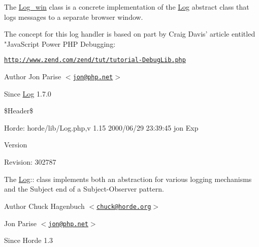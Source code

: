 The \hyperlink{class_log__win}{Log\_\-win} class is a concrete implementation of the \hyperlink{class_log}{Log} abstract class that logs messages to a separate browser window.

The concept for this log handler is based on part by Craig Davis' article entitled "JavaScript Power PHP Debugging:

\href{http://www.zend.com/zend/tut/tutorial-DebugLib.php}{\tt http://www.zend.com/zend/tut/tutorial-\/DebugLib.php}

\begin{DoxyAuthor}{Author}
Jon Parise $<$\href{mailto:jon@php.net}{\tt jon@php.net}$>$ 
\end{DoxyAuthor}
\begin{DoxySince}{Since}
\hyperlink{class_log}{Log} 1.7.0
\end{DoxySince}
\$Header\$ \begin{DoxyParagraph}{Horde:}
horde/lib/Log.php,v 1.15 2000/06/29 23:39:45 jon Exp 
\end{DoxyParagraph}


\begin{DoxyVersion}{Version}

\end{DoxyVersion}
\begin{DoxyParagraph}{Revision:}
302787 
\end{DoxyParagraph}


The \hyperlink{class_log}{Log}:: class implements both an abstraction for various logging mechanisms and the Subject end of a Subject-\/Observer pattern.

\begin{DoxyAuthor}{Author}
Chuck Hagenbuch $<$\href{mailto:chuck@horde.org}{\tt chuck@horde.org}$>$ 

Jon Parise $<$\href{mailto:jon@php.net}{\tt jon@php.net}$>$ 
\end{DoxyAuthor}
\begin{DoxySince}{Since}
Horde 1.3 
\end{DoxySince}
